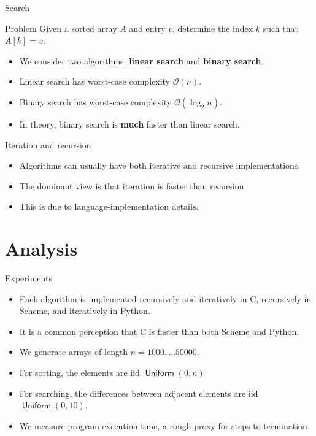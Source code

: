 \documentclass[]{beamer}
\renewcommand{\emph}{\textbf}
\newcommand{\Order}{\mathcal{O}}
\DeclareMathOperator*{\uniform}{\mathsf{Uniform}}
\begin{document}
\begin{frame}[t]{Search}
\begin{block}{Problem}
Given a sorted array $A$ and entry $v$, determine the index $k$ such that $A[k] = v$.
\end{block}
\begin{itemize}
	\item We consider two algorithms: \emph{linear search} and \emph{binary search}.
    \item Linear search has worst-case complexity $\Order(n)$.
    \item Binary search has worst-case complexity $\Order(\log_2 n)$.
    \item In theory, binary search is \emph{much} faster than linear search.
\end{itemize}
\end{frame}

\begin{frame}[t]
    \centering
\end{frame}

\begin{frame}[t]{Iteration and recursion}
\begin{itemize}
	\item Algorithms can usually have both iterative and recursive implementations.
    \item The dominant view is that iteration is faster than recursion.
    \item This is due to language-implementation details.
\end{itemize}
\end{frame}


\section{Analysis}
\begin{frame}[t]{Experiments}
	\begin{itemize}
    \item Each algorithm is implemented recursively and iteratively in C, recursively in Scheme, and iteratively in Python.
    \item It is a common perception that C is faster than both Scheme and Python.
    \item We generate arrays of length $n = 1000, \ldots 50000$.
    \item For sorting, the elements are iid $\uniform(0, n)$
    \item For searching, the differences between adjacent elements are iid $\uniform(0,10)$.
	\item We measure program execution time, a rough proxy for steps to termination.
\end{itemize}
\end{frame}
\end{document}
